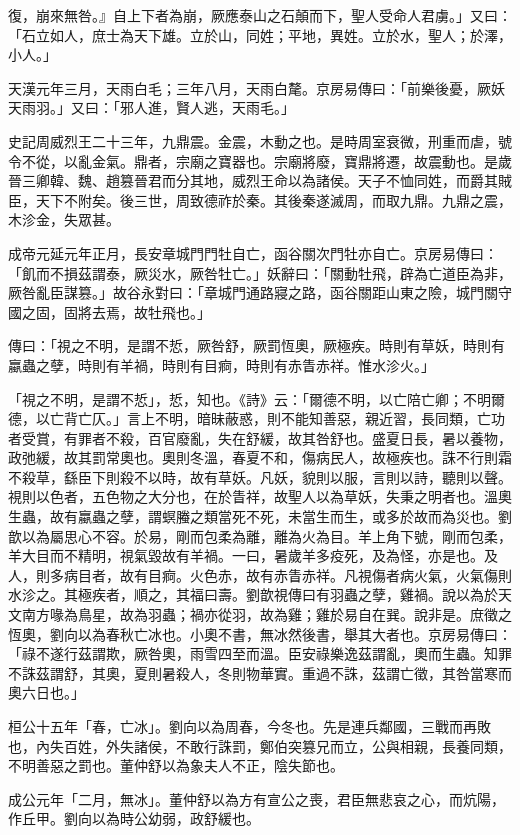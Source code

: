 \begin{pinyinscope}
復，崩來無咎。』自上下者為崩，厥應泰山之石顛而下，聖人受命人君虜。」又曰：「石立如人，庶士為天下雄。立於山，同姓；平地，異姓。立於水，聖人；於澤，小人。」

天漢元年三月，天雨白毛；三年八月，天雨白氂。京房易傳曰：「前樂後憂，厥妖天雨羽。」又曰：「邪人進，賢人逃，天雨毛。」

史記周威烈王二十三年，九鼎震。金震，木動之也。是時周室衰微，刑重而虐，號令不從，以亂金氣。鼎者，宗廟之寶器也。宗廟將廢，寶鼎將遷，故震動也。是歲晉三卿韓、魏、趙篡晉君而分其地，威烈王命以為諸侯。天子不恤同姓，而爵其賊臣，天下不附矣。後三世，周致德祚於秦。其後秦遂滅周，而取九鼎。九鼎之震，木沴金，失眾甚。

成帝元延元年正月，長安章城門門牡自亡，函谷關次門牡亦自亡。京房易傳曰：「飢而不損茲謂泰，厥災水，厥咎牡亡。」妖辭曰：「關動牡飛，辟為亡道臣為非，厥咎亂臣謀篡。」故谷永對曰：「章城門通路寢之路，函谷關距山東之險，城門關守國之固，固將去焉，故牡飛也。」

傳曰：「視之不明，是謂不悊，厥咎舒，厥罰恆奧，厥極疾。時則有草妖，時則有蠃蟲之孽，時則有羊禍，時則有目痾，時則有赤眚赤祥。惟水沴火。」

「視之不明，是謂不悊」，悊，知也。《詩》云：「爾德不明，以亡陪亡卿；不明爾德，以亡背亡仄。」言上不明，暗昧蔽惑，則不能知善惡，親近習，長同類，亡功者受賞，有罪者不殺，百官廢亂，失在舒緩，故其咎舒也。盛夏日長，暑以養物，政弛緩，故其罰常奧也。奧則冬溫，春夏不和，傷病民人，故極疾也。誅不行則霜不殺草，繇臣下則殺不以時，故有草妖。凡妖，貌則以服，言則以詩，聽則以聲。視則以色者，五色物之大分也，在於眚祥，故聖人以為草妖，失秉之明者也。溫奧生蟲，故有蠃蟲之孽，謂螟螣之類當死不死，未當生而生，或多於故而為災也。劉歆以為屬思心不容。於易，剛而包柔為離，離為火為目。羊上角下號，剛而包柔，羊大目而不精明，視氣毀故有羊禍。一曰，暑歲羊多疫死，及為怪，亦是也。及人，則多病目者，故有目痾。火色赤，故有赤眚赤祥。凡視傷者病火氣，火氣傷則水沴之。其極疾者，順之，其福曰壽。劉歆視傳曰有羽蟲之孽，雞禍。說以為於天文南方喙為鳥星，故為羽蟲；禍亦從羽，故為雞；雞於易自在巽。說非是。庶徵之恆奧，劉向以為春秋亡冰也。小奧不書，無冰然後書，舉其大者也。京房易傳曰：「祿不遂行茲謂欺，厥咎奧，雨雪四至而溫。臣安祿樂逸茲謂亂，奧而生蟲。知罪不誅茲謂舒，其奧，夏則暑殺人，冬則物華實。重過不誅，茲謂亡徵，其咎當寒而奧六日也。」

桓公十五年「春，亡冰」。劉向以為周春，今冬也。先是連兵鄰國，三戰而再敗也，內失百姓，外失諸侯，不敢行誅罰，鄭伯突篡兄而立，公與相親，長養同類，不明善惡之罰也。董仲舒以為象夫人不正，陰失節也。

成公元年「二月，無冰」。董仲舒以為方有宣公之喪，君臣無悲哀之心，而炕陽，作丘甲。劉向以為時公幼弱，政舒緩也。


\end{pinyinscope}
